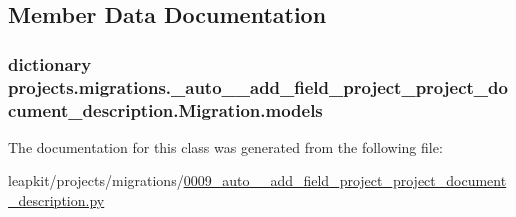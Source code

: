 \subsection{Member Data Documentation}
\hypertarget{classprojects_1_1migrations_1_10009__auto____add__field__project__project__document__description_1_1_migration_ab13a3e916939d8719470c28854235e3b}{
\subsubsection[{models}]{\setlength{\rightskip}{0pt plus 5cm}dictionary projects.\-migrations.\-\_\-auto\-\_\-\-\_\-add\-\_\-field\-\_\-project\-\_\-project\-\_\-document\-\_\-description.\-Migration.\-models\hspace{0.3cm}{\ttfamily [static]}}}\label{classprojects_1_1migrations_1_10009__auto____add__field__project__project__document__description_1_1_migration_ab13a3e916939d8719470c28854235e3b}


The documentation for this class was generated from the following file\-:\begin{DoxyCompactItemize}
\item 
leapkit/projects/migrations/\hyperlink{0009__auto____add__field__project__project__document__description_8py}{0009\-\_\-auto\-\_\-\-\_\-add\-\_\-field\-\_\-project\-\_\-project\-\_\-document\-\_\-description.\-py}\end{DoxyCompactItemize}
